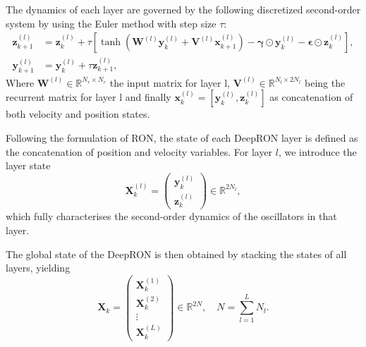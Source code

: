 The dynamics of each layer are governed by the following discretized second-order system by using the Euler method with step size $\tau$:
\begin{equation}
\label{eq:method:deepron_dynamics}
\begin{aligned}
    \mathbf{z}^{(l)}_{k+1} &= \mathbf{z}^{(l)}_k + \tau \left[ \tanh\left(\mathbf{W}^{(l)}\mathbf{y}^{(l)}_k + \mathbf{V}^{(l)}\mathbf{x}^{(l)}_{k+1} \right) - \bm{\gamma} \odot \mathbf{y}^{(l)}_k - \bm{\epsilon} \odot \mathbf{z}^{(l)}_k \right], \\
    \mathbf{y}^{(l)}_{k+1} &= \mathbf{y}^{(l)}_k + \tau \mathbf{z}^{(l)}_{k+1},
\end{aligned}
\end{equation}
Where $\mathbf{W}^{(l)} \in \mathbb{R}^{N_r\times N_{r}}$ the input matrix for layer l, $\mathbf{V}^{(l)} \in \mathbb{R}^{N_{l} \times2N_{l}}$ being the recurrent matrix for layer l and finally $\mathbf{x}_k^{(l)} = [\mathbf{y}^{(l)}_k, \mathbf{z}_k^{(l)}] $ as concatenation of both velocity and position states.

Following the formulation of RON, the state of each DeepRON layer
is defined as the concatenation of position and velocity variables.
For layer $l$, we introduce the layer state
\begin{equation}
    \mathbf{X}^{(l)}_k =
    \begin{pmatrix}
        \mathbf{y}^{(l)}_k \\
        \mathbf{z}^{(l)}_k
    \end{pmatrix}
    \in \mathbb{R}^{2N_l},
\end{equation}
which fully characterises the second-order dynamics of the oscillators in that layer.

The global state of the DeepRON is then obtained by stacking the states of all layers, yielding
\begin{equation}
    \mathbf{X}_k =
    \begin{pmatrix}
        \mathbf{X}^{(1)}_k \\
        \mathbf{X}^{(2)}_k \\
        \vdots \\
        \mathbf{X}^{(L)}_k
    \end{pmatrix}
    \in \mathbb{R}^{2N},
    \quad
    N = \sum_{l=1}^{L} N_l.
\end{equation}

